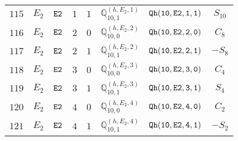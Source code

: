\documentclass[fleqn,8pt]{jsarticle}
\begin{document}
\begin{table}[ht!]
\begin{center}
\begin{tabular}{cccccccc}
$ 115 $ & $ E_{2} $ & $ {\tt E2} $ & $ 1 $ & $ 1 $ & $ \mathbb{Q}_{10,1}^{(h,E_{2},1)} $ & $ {\tt Qh(10,E2,1,1)} $ & $ S_{10} $ \\
$ 116 $ & $ E_{2} $ & $ {\tt E2} $ & $ 2 $ & $ 0 $ & $ \mathbb{Q}_{10,0}^{(h,E_{2},2)} $ & $ {\tt Qh(10,E2,2,0)} $ & $ C_{8} $ \\
$ 117 $ & $ E_{2} $ & $ {\tt E2} $ & $ 2 $ & $ 1 $ & $ \mathbb{Q}_{10,1}^{(h,E_{2},2)} $ & $ {\tt Qh(10,E2,2,1)} $ & $ - S_{8} $ \\
$ 118 $ & $ E_{2} $ & $ {\tt E2} $ & $ 3 $ & $ 0 $ & $ \mathbb{Q}_{10,0}^{(h,E_{2},3)} $ & $ {\tt Qh(10,E2,3,0)} $ & $ C_{4} $ \\
$ 119 $ & $ E_{2} $ & $ {\tt E2} $ & $ 3 $ & $ 1 $ & $ \mathbb{Q}_{10,1}^{(h,E_{2},3)} $ & $ {\tt Qh(10,E2,3,1)} $ & $ S_{4} $ \\
$ 120 $ & $ E_{2} $ & $ {\tt E2} $ & $ 4 $ & $ 0 $ & $ \mathbb{Q}_{10,0}^{(h,E_{2},4)} $ & $ {\tt Qh(10,E2,4,0)} $ & $ C_{2} $ \\
$ 121 $ & $ E_{2} $ & $ {\tt E2} $ & $ 4 $ & $ 1 $ & $ \mathbb{Q}_{10,1}^{(h,E_{2},4)} $ & $ {\tt Qh(10,E2,4,1)} $ & $ - S_{2} $ \\
 \hline \hline
\end{tabular}
\end{center}
\end{table}
\end{document}
